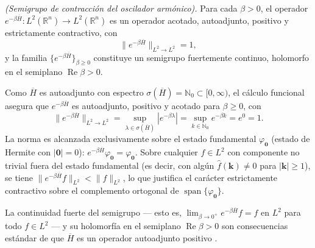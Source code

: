             \begin{proposition}\label{prop:Cap24SemigrupoContr}
                \textit{(Semigrupo de contracción del oscilador armónico).} Para cada $\beta > 0$, el operador $e^{-\beta \overline{H}} : L^2(\mathbb{R}^n) \to L^2(\mathbb{R}^n)$ es un operador acotado, autoadjunto, positivo y estrictamente contractivo, con
                \begin{equation}\label{eq:Cap24NormaSemigrupo}
                    \|e^{-\beta \overline{H}}\|_{L^2 \to L^2} = 1,
                \end{equation}
                y la familia $\{e^{-\beta \overline{H}}\}_{\beta \geq 0}$ constituye un semigrupo fuertemente continuo, holomorfo en el semiplano $\operatorname{Re}\beta > 0$.
            \end{proposition}
            \begin{Proof}
                Como $\overline{H}$ es autoadjunto con espectro $\sigma(\overline{H}) = \mathbb{N}_0 \subset [0, \infty)$, el cálculo funcional \citep[Thm. VIII.5]{reed1980methods} asegura que $e^{-\beta \overline{H}}$ es autoadjunto, positivo y acotado para $\beta \geq 0$, con
                \begin{equation*}
                    \|e^{-\beta \overline{H}}\|_{L^2 \to L^2} = \sup_{\lambda \in \sigma(\overline{H})} |e^{-\beta \lambda}| = \sup_{k \in \mathbb{N}_0} e^{-\beta k} = e^0 = 1.
                \end{equation*}
                La norma es alcanzada exclusivamente sobre el estado fundamental $\varphi_{\boldsymbol{0}}$ (estado de Hermite con $|\boldsymbol{0}| = 0$): $e^{-\beta \overline{H}}\varphi_{\boldsymbol{0}} = \varphi_{\boldsymbol{0}}$. Sobre cualquier $f \in L^2$ con componente no trivial fuera del estado fundamental (es decir, con algún $\hat{f}(\boldsymbol{k}) \neq 0$ para $|\boldsymbol{k}| \geq 1$), se tiene $\|e^{-\beta \overline{H}}f\|_{L^2} < \|f\|_{L^2}$, lo que justifica el carácter estrictamente contractivo sobre el complemento ortogonal de $\operatorname{span}\{\varphi_{\boldsymbol{0}}\}$.

                La continuidad fuerte del semigrupo --- esto es, $\lim_{\beta \to 0^+} e^{-\beta \overline{H}}f = f$ en $L^2$ para todo $f \in L^2$ --- y su holomorfía en el semiplano $\operatorname{Re}\beta > 0$ son consecuencias estándar de que $\overline{H}$ es un operador autoadjunto positivo \citep[Ch. II, \S4.6]{engel2000one}.
            \end{Proof}


